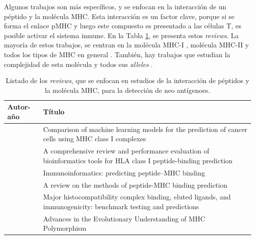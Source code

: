 Algunos trabajos son más específicos, y se enfocan en la interacción de un péptido y la molécula MHC. Esta interacción es un factor clave, porque si se forma el enlace pMHC y luego este compuesto es presentado a las células T, es posible activar el sistema inmune. En la Tabla \ref{tab:review_mhc}, se presenta estos \textit{reviews}. La mayoría de estos trabajos, se centran en la molécula MHC-I \citep{mateo2020comparison, mei2020comprehensive, schmidt2019mhc, mei2020comprehensive} , molécula MHC-II \citep{jensen2018improved} y todos los tipos de MHC en general \citep{nielsen2020immunoinformatics, liu2020review, liu2020review}. También, hay trabajos que estudian la complejidad de esta molécula y todos sus \textit{alleles} \citep{radwan2020advances}.



\begin{table}[H]
	\caption{Listado de los \textit{reviews}, que se enfocan en estudios de la interacción de péptidos y la molécula MHC, para la detección de neo antígenoes.}
	\label{tab:review_mhc}
	\begin{tabular}{p{3cm}p{10cm}}
		\textbf{Autor-año }                            & \textbf{Título}                                                                                                                                \\ \hline
		\cite{mateo2020comparison}          & Comparison of machine learning models for the prediction of cancer cells using MHC class I complexes                 \\
		\cite{mei2020comprehensive}         & A comprehensive review and performance evaluation of bioinformatics tools for HLA class I peptide-binding prediction \\
		
		\cite{nielsen2020immunoinformatics} & Immunoinformatics: predicting peptide–MHC binding                                                                    \\
		\cite{liu2020review}                & A review on the methods of peptide-MHC binding prediction                                                            \\
		\cite{paul2020major}                & Major histocompatibility complex binding, eluted ligands, and immunogenicity: benchmark testing and predictions      \\
	
		\cite{radwan2020advances}           & Advances in the Evolutionary Understanding of MHC Polymorphism 
		

\end{tabular}
\end{table}
